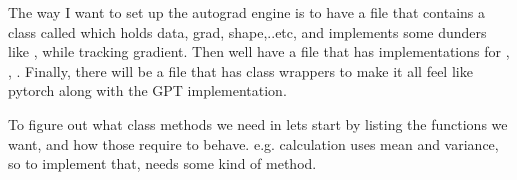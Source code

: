 \documentclass[11pt]{article}
\begin{document}
The way I want to set up the autograd engine is to have 
a  file that contains a class called  which holds data, grad, shape,..etc, and 
implements some dunders like ,  while tracking gradient. Then well have a 
file that has  implementations for , , . Finally, there 
will be a  file that has class wrappers to make it all feel like pytorch along with the
GPT implementation. 
\par To figure out what class methods we need in  lets start by listing the functions we want, and how 
those require  to behave. e.g.  calculation uses 
mean and variance, so to implement that,
 needs some kind of  method.
\end{document}
